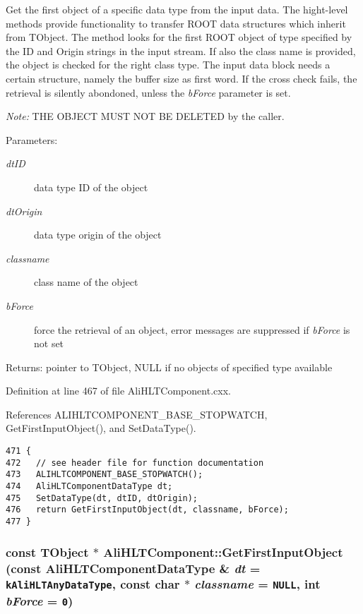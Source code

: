 Get the first object of a specific data type from the input data. The hight-level methods provide functionality to transfer ROOT data structures which inherit from TObject. The method looks for the first ROOT object of type specified by the ID and Origin strings in the input stream. If also the class name is provided, the object is checked for the right class type. The input data block needs a certain structure, namely the buffer size as first word. If the cross check fails, the retrieval is silently abondoned, unless the {\em b\-Force\/} parameter is set.\par
 {\em Note:\/} THE OBJECT MUST NOT BE DELETED by the caller. \begin{Desc}
\item[Parameters:]
\begin{description}
\item[{\em dt\-ID}]data type ID of the object \item[{\em dt\-Origin}]data type origin of the object \item[{\em classname}]class name of the object \item[{\em b\-Force}]force the retrieval of an object, error messages are suppressed if {\em b\-Force\/} is not set \end{description}
\end{Desc}
\begin{Desc}
\item[Returns:]pointer to TObject, NULL if no objects of specified type available \end{Desc}


Definition at line 467 of file Ali\-HLTComponent.cxx.

References ALIHLTCOMPONENT\_\-BASE\_\-STOPWATCH, Get\-First\-Input\-Object(), and Set\-Data\-Type().

\footnotesize\begin{verbatim}471 {
472   // see header file for function documentation
473   ALIHLTCOMPONENT_BASE_STOPWATCH();
474   AliHLTComponentDataType dt;
475   SetDataType(dt, dtID, dtOrigin);
476   return GetFirstInputObject(dt, classname, bForce);
477 }
\end{verbatim}\normalsize 


\subsubsection{\setlength{\rightskip}{0pt plus 5cm}const TObject $\ast$ Ali\-HLTComponent::Get\-First\-Input\-Object (const {\bf Ali\-HLTComponent\-Data\-Type} \& {\em dt} = {\tt {\bf k\-Ali\-HLTAny\-Data\-Type}}, const char $\ast$ {\em classname} = {\tt NULL}, int {\em b\-Force} = {\tt 0})\hspace{0.3cm}{\tt  [protected]}}\label{classAliHLTComponent_b13}


